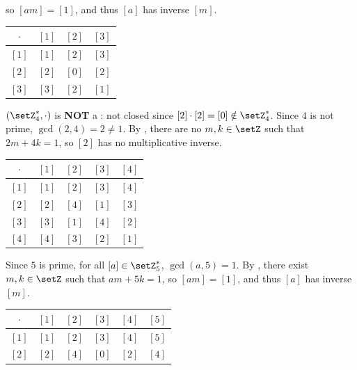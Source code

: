 \begin{enumerate}
\begin{subprove}
    so \([a m] = [1]\), and thus \([a]\) has inverse \([m]\). \\
    \begin{center}
    \begin{tabular}{|c|c|c|c|}
    \hline
    \(\cdot\) & \([1]\) & \([2]\) & \([3]\) \\
    \hline
    \([1]\) & \([1]\) & \([2]\) & \([3]\) \\
    \hline
    \([2]\) & \([2]\) & \([0]\) & \([2]\) \\
    \hline
    \([3]\) & \([3]\) & \([2]\) & \([1]\) \\
    \hline
    \end{tabular}
    \end{center}
    \((\setZ_{4}^{*}, \cdot)\) is \textbf{NOT} a : 
    not closed since \([2] \cdot [2] = [0] \notin \setZ_{4}^{*}\). 
    Since \(4\) is not prime, \(\gcd(2, 4) = 2 \neq 1\). 
    By , there are no \(m, k \in \setZ\) 
    such that \(2 m + 4 k = 1\), so \([2]\) has no multiplicative inverse.\\
    \begin{center}
    \begin{tabular}{|c|c|c|c|c|}
    \hline
    \(\cdot\) & \([1]\) & \([2]\) & \([3]\) & \([4]\) \\
    \hline
    \([1]\) & \([1]\) & \([2]\) & \([3]\) & \([4]\) \\
    \hline
    \([2]\) & \([2]\) & \([4]\) & \([1]\) & \([3]\) \\
    \hline
    \([3]\) & \([3]\) & \([1]\) & \([4]\) & \([2]\) \\
    \hline
    \([4]\) & \([4]\) & \([3]\) & \([2]\) & \([1]\) \\
    \hline
    \end{tabular}
    \end{center}
    Since \(5\) is prime, for all \([a] \in \setZ_{5}^{*}\), \(\gcd(a, 5) = 1\). 
    By , there exist \(m, k \in \setZ\) 
    such that \(a m + 5 k = 1\), so \([a m] = [1]\), and thus \([a]\) 
    has inverse \([m]\). \\
    \begin{center}
    \begin{tabular}{|c|c|c|c|c|c|}
    \hline
    \(\cdot\) & \([1]\) & \([2]\) & \([3]\) & \([4]\) & \([5]\) \\
    \hline
    \([1]\) & \([1]\) & \([2]\) & \([3]\) & \([4]\) & \([5]\) \\
    \hline
    \([2]\) & \([2]\) & \([4]\) & \([0]\) & \([2]\) & \([4]\) \\

\end{tabular}
\end{center}
\end{subprove}
\end{enumerate}
